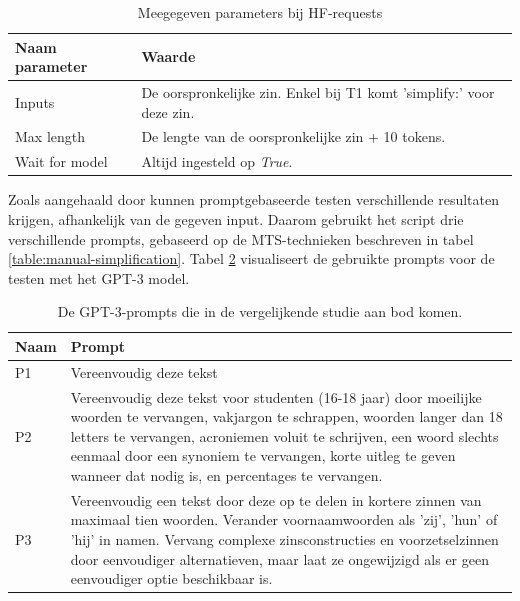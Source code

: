 \begin{center}
	\begin{table}[H]
		\begin{tabular}{ | m{6cm} | m{8cm} | } 
			\hline
			\textbf{Naam parameter} & \textbf{Waarde} \\
			\hline
			Inputs & De oorspronkelijke zin. Enkel bij T1 komt 'simplify:' voor deze zin. \\
			\hline
			Max length & De lengte van de oorspronkelijke zin + 10 tokens. \\
			\hline
			Wait for model & Altijd ingesteld op \textit{True}. \\
			\hline
		\end{tabular}
		\caption{Meegegeven parameters bij HF-requests}
		\label{table:huggingface-requests-parameters}
	\end{table}
\end{center}

Zoals aangehaald door \textcite{Gooding2022} kunnen promptgebaseerde testen verschillende resultaten krijgen, afhankelijk van de gegeven input. Daarom gebruikt het script drie verschillende prompts, gebaseerd op de MTS-technieken beschreven in tabel \ref{table:manual-simplification}. Tabel \ref{table:tested-prompts} visualiseert de gebruikte prompts voor de testen met het GPT-3 model. 

\begin{center}
	\begin{table}[H]
		\begin{tabular}{ | m{2cm} | m{13cm} | } 
			\hline
			\textbf{Naam} & \textbf{Prompt} \\
			\hline
			P1 & Vereenvoudig deze tekst \\
			\hline
			P2 & Vereenvoudig deze tekst voor studenten (16-18 jaar) door moeilijke woorden te vervangen, vakjargon te schrappen, woorden langer dan 18 letters te vervangen, acroniemen voluit te schrijven, een woord slechts eenmaal door een synoniem te vervangen, korte uitleg te geven wanneer dat nodig is, en percentages te vervangen. \\
			\hline
			P3 & Vereenvoudig een tekst door deze op te delen in kortere zinnen van maximaal tien woorden. Verander voornaamwoorden als 'zij', 'hun' of 'hij' in namen. Vervang complexe zinsconstructies en voorzetselzinnen door eenvoudiger alternatieven, maar laat ze ongewijzigd als er geen eenvoudiger optie beschikbaar is. \\
			\hline
		\end{tabular}
		\caption{De GPT-3-prompts die in de vergelijkende studie aan bod komen.}
		\label{table:tested-prompts}
	\end{table}
\end{center}

